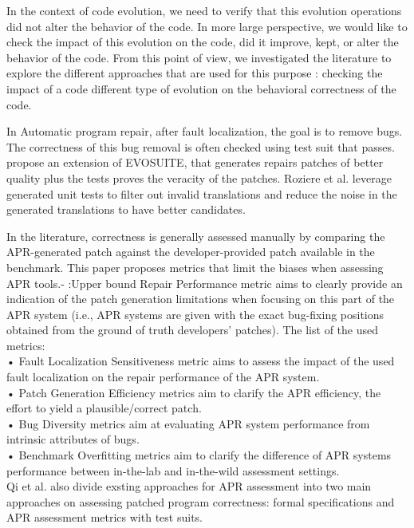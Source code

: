  In the context of code evolution, we need to verify that this evolution operations did not alter the behavior of the code. 
 In more large perspective, we would like to check the impact of this evolution on the code, did it improve, kept, or alter the behavior of the code. From this point of view, we investigated the literature to explore the different approaches that are used for this purpose : checking the impact of a code different type of evolution on the behavioral correctness of the code.
 
In Automatic program repair, after fault localization, the goal is to remove bugs. The correctness of this bug removal is often checked using test suit that passes.
\cite{10638555} propose an extension of EVOSUITE, that generates repairs patches of better quality plus the tests proves the veracity of the patches.
Roziere et al. \cite{roziere2021leveraging} leverage generated unit tests to filter out invalid translations and reduce the noise in the generated translations to have better candidates.


In the literature, correctness is generally assessed manually by comparing the APR-generated patch against the developer-provided patch available in the benchmark. This paper proposes metrics that limit the biases when assessing APR tools.- :Upper bound Repair Performance metric aims to clearly provide an indication of the patch generation limitations when focusing on this part of the APR system (i.e., APR systems are given with the exact bug-fixing positions obtained from the ground of truth developers’ patches). The list of the used metrics:\\
• Fault Localization Sensitiveness metric aims to assess the impact of the used fault localization on the repair performance of the APR system.\\
• Patch Generation Efficiency metrics aim to clarify the APR efficiency, the effort to yield a plausible/correct patch.\\
• Bug Diversity metrics aim at evaluating APR system performance from intrinsic attributes of bugs.\\
• Benchmark Overfitting metrics aim to clarify the difference of APR systems performance between in-the-lab and in-the-wild assessment settings.\\

Qi et al. \cite{8612557} also divide exsting approaches for APR assessment into two main approaches on assessing patched program correctness: formal specifications and APR assessment metrics with test suits.

